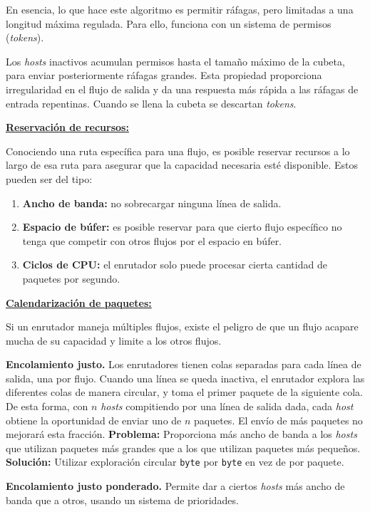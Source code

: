 \documentclass[10pt,a4paper]{article}
\begin{document}
En esencia, lo que hace este algoritmo es permitir ráfagas, pero limitadas a una longitud máxima regulada. Para ello, funciona con un sistema de permisos (\textit{tokens}).

Los \textit{hosts} inactivos acumulan permisos hasta el tamaño máximo de la cubeta, para enviar posteriormente ráfagas grandes. Esta propiedad proporciona irregularidad en el flujo de salida y da una respuesta más rápida a las ráfagas de entrada repentinas. Cuando se llena la cubeta se descartan \textit{tokens}.

\underline{\textbf{Reservación de recursos:}}

Conociendo una ruta específica para una flujo, es posible reservar recursos a lo largo de esa ruta para asegurar que la capacidad necesaria esté disponible. Estos pueden ser del tipo:
\begin{enumerate}
\item \textbf{Ancho de banda:} no sobrecargar ninguna línea de salida.
\item \textbf{Espacio de búfer:} es posible reservar para que cierto flujo específico no tenga que competir con otros flujos por el espacio en búfer.
\item \textbf{Ciclos de CPU:} el enrutador solo puede procesar cierta cantidad de paquetes por segundo.
\end{enumerate}

\underline{\textbf{Calendarización de paquetes:}}

Si un enrutador maneja múltiples flujos, existe el peligro de que un flujo acapare mucha de su capacidad y limite a los otros flujos.

\begin{description}
\item \textbf{Encolamiento justo.} Los enrutadores tienen colas separadas para cada línea de salida, una por flujo. Cuando una línea se queda inactiva, el enrutador explora las diferentes colas de manera circular, y toma el primer paquete de la siguiente cola. De esta forma, con $n$ \textit{hosts} compitiendo por una línea de salida dada, cada \textit{host} obtiene la oportunidad de enviar uno de $n$ paquetes. El envío de más paquetes no mejorará esta fracción.
\subitem \textbf{Problema:} Proporciona más ancho de banda a los \textit{hosts} que utilizan paquetes más grandes que a los que utilizan paquetes más pequeños.
\subitem \textbf{Solución:} Utilizar exploración circular \texttt{byte} por \texttt{byte} en vez de por paquete.

\item \textbf{Encolamiento justo ponderado.} Permite dar a ciertos \textit{hosts} más ancho de banda que a otros, usando un sistema de prioridades.
\end{description}
\end{document}
